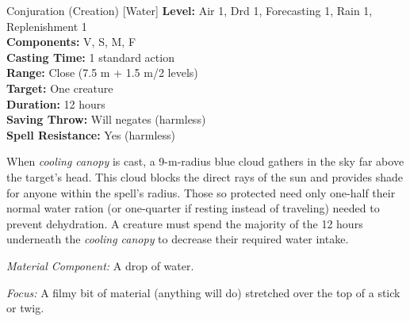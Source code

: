 {Conjuration (Creation) [Water]}
{
	\textbf{Level:}
	Air 1, Drd 1, Forecasting 1, Rain 1, Replenishment 1\\
	\textbf{Components:}
	V, S, M, F\\
	\textbf{Casting Time:}
	1 standard action\\
	\textbf{Range:}
	Close (7.5 m + 1.5 m/2 levels)\\
	\textbf{Target:}
	One creature\\
	\textbf{Duration:}
	12 hours\\
	\textbf{Saving Throw:}
	Will negates (harmless)\\
	\textbf{Spell Resistance:}
	Yes (harmless)\\
}
{
	When \emph{cooling canopy} is cast, a 9-m-radius blue cloud gathers in the sky far above the target's head. This cloud blocks the direct rays of the sun and provides shade for anyone within the spell's radius. Those so protected need only one-half their normal water ration (or one-quarter if resting instead of traveling) needed to prevent dehydration. A creature must spend the majority of the 12 hours underneath the \emph{cooling canopy} to decrease their required water intake.

	\textit{Material Component:} A drop of water.

	\textit{Focus:} A filmy bit of material (anything will do) stretched over the top of a stick or twig.
}
